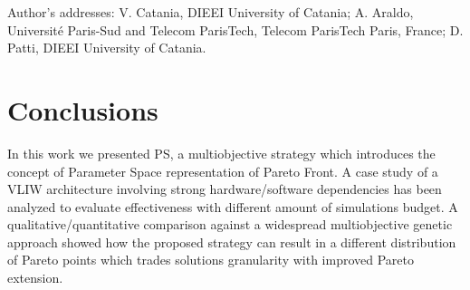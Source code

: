 \documentclass[prodmode,acmtecs]{acmsmall}
\begin{document}




\begin{bottomstuff}
Author's addresses: V. Catania, DIEEI University of Catania;
A. Araldo, Universit\'e Paris-Sud and Telecom ParisTech, Telecom ParisTech
Paris, France;
D. Patti, DIEEI University of Catania.
\end{bottomstuff}

\maketitle





\section{Conclusions}
In this work we presented PS, a multiobjective strategy which 
introduces the concept of Parameter Space representation of Pareto
Front. A case study of a VLIW architecture involving strong
hardware/software dependencies has been analyzed to evaluate
effectiveness with different amount of simulations budget.
A qualitative/quantitative comparison against a widespread multiobjective genetic
approach showed how the proposed strategy can result in a different
distribution of Pareto points which trades solutions granularity with
improved Pareto extension. 

\balance

 


\end{document}
